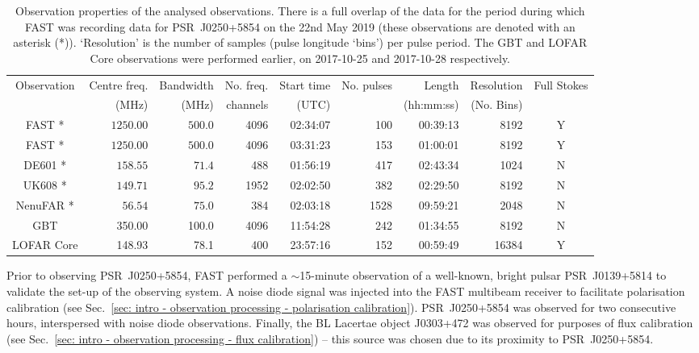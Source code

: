 \begin{landscape} %
\begin{table}
	\centering
	\caption[Summary of the simultaneous observations of PSR~J0250+5854]{Observation properties of the analysed observations. There is a full overlap of the data for the period during which FAST was recording data for PSR~J0250+5854 on the 22nd May 2019 (these observations are denoted with an asterisk (*)). `Resolution' is the number of samples (pulse longitude `bins') per pulse period. The GBT and LOFAR Core observations were performed earlier, on 2017-10-25 and 2017-10-28 respectively.}
	\label{tab: J0250 - observations}
	\begin{tabular}{crrrrrrrc} %
		\hline
	    Observation & Centre freq. & Bandwidth & No. freq. & Start time & No. pulses & Length & Resolution & Full Stokes\\
	    & (MHz) & (MHz) & channels & (UTC) & & (hh:mm:ss) & (No. Bins)&\\
		\hline
		FAST *        & $1250.00$ & $500.0$   & 4096 & 02:34:07  & 100   & 00:39:13  & 8192 & Y\\
		FAST *	    & $1250.00$ & $500.0$   & 4096 & 03:31:23 & 153   & 01:00:01  & 8192 & Y\\
		DE601 *        & $158.55$  & $71.4$    & 488  & 01:56:19  & 417   & 02:43:34  & 1024  & N \\
		UK608 *  & $149.71$  & $95.2$    & 1952 & 02:02:50  & 382   & 02:29:50  & 8192  & N\\
		NenuFAR *     & $56.54$   & $75.0$    & 384  & 02:03:18  & 1528  & 09:59:21  & 2048  & N \\
		\hline
		GBT & 350.00 & 100.0 & 4096 & 11:54:28 & 242 & 01:34:55 & 8192 & N\\
		LOFAR Core & 148.93 & 78.1 & 400 & 23:57:16 & 152 & 00:59:49 & 16384 & Y\\
		\hline
	\end{tabular}
\end{table}
\end{landscape}

Prior to observing PSR~J0250+5854, FAST performed a $\sim$15-minute observation of a well-known, bright pulsar PSR~J0139+5814 to validate the set-up of the observing system. A noise diode signal was injected into the FAST multibeam receiver to facilitate polarisation calibration (see Sec.~\ref{sec: intro - observation processing - polarisation calibration}). PSR~J0250+5854 was observed for two consecutive hours, interspersed with noise diode observations. Finally, the BL Lacertae object J0303+472 \citep{VVxx2006} was observed for purposes of flux calibration (see Sec.~\ref{sec: intro - observation processing - flux calibration}) -- this source was chosen due to its proximity to PSR~J0250+5854.

